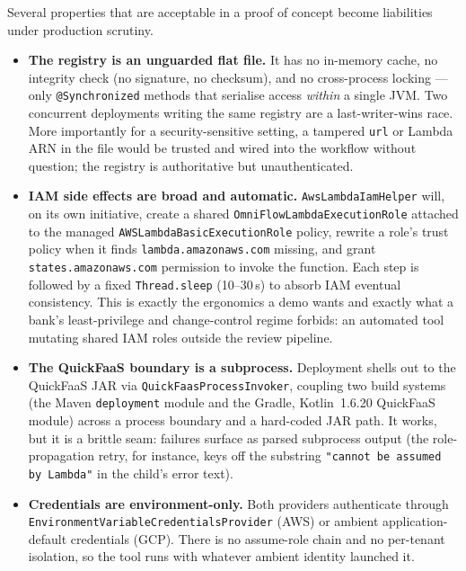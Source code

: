 Several properties that are acceptable in a proof of concept become liabilities under
production scrutiny.

\begin{itemize}
    \item \textbf{The registry is an unguarded flat file.} It has no in-memory cache, no
    integrity check (no signature, no checksum), and no cross-process locking --- only
    \texttt{@Synchronized} methods that serialise access \emph{within} a single JVM. Two
    concurrent deployments writing the same registry are a last-writer-wins race. More
    importantly for a security-sensitive setting, a tampered \texttt{url} or Lambda ARN in the
    file would be trusted and wired into the workflow without question; the registry is
    authoritative but unauthenticated.
    \item \textbf{IAM side effects are broad and automatic.} \texttt{AwsLambdaIamHelper} will,
    on its own initiative, create a shared \texttt{OmniFlowLambdaExecutionRole} attached to the
    managed \texttt{AWSLambdaBasicExecutionRole} policy, rewrite a role's trust policy when it
    finds \texttt{lambda.amazonaws.com} missing, and grant \texttt{states.amazonaws.com}
    permission to invoke the function. Each step is followed by a fixed \texttt{Thread.sleep}
    (10--30\,s) to absorb IAM eventual consistency. This is exactly the ergonomics a demo wants
    and exactly what a bank's least-privilege and change-control regime forbids: an automated
    tool mutating shared IAM roles outside the review pipeline.
    \item \textbf{The QuickFaaS boundary is a subprocess.} Deployment shells out to the
    QuickFaaS JAR via \texttt{QuickFaasProcessInvoker}, coupling two build systems (the Maven
    \texttt{deployment} module and the Gradle, Kotlin~1.6.20 QuickFaaS module) across a
    process boundary and a hard-coded JAR path. It works, but it is a brittle seam: failures
    surface as parsed subprocess output (the role-propagation retry, for instance, keys off the
    substring \texttt{"cannot be assumed by Lambda"} in the child's error text).
    \item \textbf{Credentials are environment-only.} Both providers authenticate through
    \texttt{EnvironmentVariableCredentialsProvider} (AWS) or ambient application-default
    credentials (GCP). There is no assume-role chain and no per-tenant isolation, so the tool
    runs with whatever ambient identity launched it.
\end{itemize}

